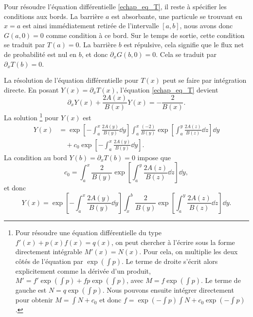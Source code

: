 \documentclass[openany,a4paper,12pt]{article}
\begin{document}
\par Pour résoudre l'équation différentielle \ref{echap_eq_T}, il reste à spécifier les conditions aux bords. La barrière $a$ est absorbante, une particule se trouvant en $x=a$ est ainsi immédiatement retirée de l'intervalle $[a,b]$, nous avons donc $G(a,0)=0$ comme condition à ce bord. Sur le temps de sortie, cette condition se traduit par $T(a)=0$. La barrière $b$ est répulsive, cela signifie que le flux net de probabilité est nul en $b$, et donc $\partial_x G(b,0) = 0$. Cela se traduit par $\partial_x T(b) = 0$.

\par La résolution de l'équation différentielle pour $T(x)$ peut se faire par intégration directe. En posant $Y(x) = \partial_x T(x)$, l'équation \ref{echap_eq_T} devient 
%
\begin{equation}\label{echap_eq_T_int_directe}
	\partial_x Y(x) + \frac{2A(x)}{B(x)} Y(x) = -\frac{2}{B(x)}.
\end{equation}
%
La solution
\footnote{
	Pour résoudre une équation différentielle du type $f'(x)+p(x)f(x)=q(x)$, on peut chercher à l'écrire sous la forme directement intégrable $M'(x) = N(x)$. Pour cela, on multiplie les deux côtés de l'équation par $\exp(\int p)$. Le terme de droite s'écrit alors explicitement comme la dérivée d'un produit, $M' = f'\exp(\int p) + f p \exp(\int p)$, avec $M = f\exp(\int p)$. Le terme de gauche est $N = q \exp(\int p)$. Nous pouvons ensuite intégrer directement pour obtenir $M = \int N + c_0$ et donc $f = \exp(-\int p) \int N + c_0 \exp(-\int p)$.
}
pour $Y(x)$ est 
%
\begin{equation}\label{echap_sol_Y_avec_c0}
\begin{split}
	Y(x) &= \exp\left[ - \int_a^x \frac{2 A(y)}{B(y)} \dd y \right]
	\int_a^x \frac{(-2)}{B(y)} \exp\left[ \int_a^y \frac{2 A(z)}{B(z)} \dd z\right] \dd y \\
	&\quad + c_0 \exp\left[ - \int_a^x \frac{2 A(y)}{B(y)} \dd y \right].
\end{split}	
\end{equation}
%
La condition au bord $Y(b)=\partial_x T(b)=0$ impose que 
%
\begin{equation}\label{echap_sol_Y_bord_b}
	c_0 = \int_a^x \frac{2}{B(y)} \exp\left[ \int_a^y \frac{2 A(z)}{B(z)} \dd z\right] \dd y,
\end{equation}
%
et donc
%
\begin{equation}\label{echap_sol_Y_sans_c0}
	Y(x) = \exp\left[ - \int_a^x \frac{2 A(y)}{B(y)} \dd y \right]
	\int_x^b \frac{2}{B(y)} \exp\left[ \int_a^y \frac{2 A(z)}{B(z)} \dd z\right] \dd y.
\end{equation}
\end{document}
